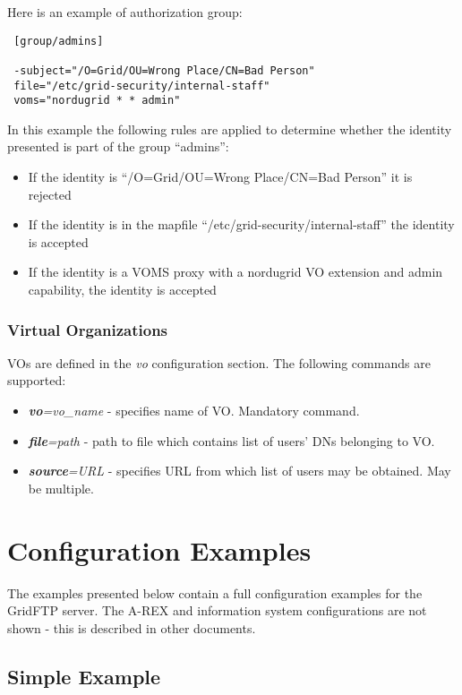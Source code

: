 \documentclass{article}
\begin{document}
Here is an example of authorization group:

\begin{verbatim}
 [group/admins]

 -subject="/O=Grid/OU=Wrong Place/CN=Bad Person"
 file="/etc/grid-security/internal-staff"
 voms="nordugrid * * admin"
\end{verbatim}

In this example the following rules are applied to determine whether
the identity presented is part of the group ``admins'':

\begin{itemize}
\item If the identity is ``/O=Grid/OU=Wrong Place/CN=Bad Person'' it
  is rejected
\item If the identity is in the mapfile
  ``/etc/grid-security/internal-staff'' the identity is accepted
\item If the identity is a VOMS proxy with a nordugrid VO extension
  and admin capability, the identity is accepted
\end{itemize}

\subsubsection{Virtual Organizations}

VOs are defined in the \emph{vo} configuration section. The following
commands are supported:

\begin{itemize}
\item \textbf{\textit{vo}}\textit{=vo\_name} - specifies name of
  VO. Mandatory command.
\item \textbf{\textit{file}}\textit{=path} - path to file which
  contains list of users' DNs belonging to VO.
\item \textbf{\textit{source}}\textit{=URL} - specifies URL from which
  list of users may be obtained. May be multiple.
\end{itemize}


\section{Configuration Examples}

The examples presented below contain a full configuration examples for
the GridFTP server. The A-REX and information system configurations
are not shown - this is described in other documents.


\subsection{Simple Example}
\end{document}
